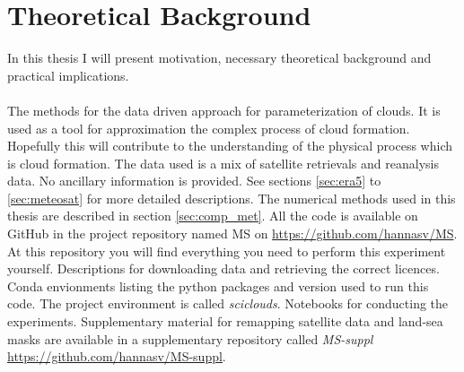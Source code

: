 \setcounter{chapter}{1} 
\chapter{Theoretical Background} \label{ch:theoretical_back}
In this thesis I will present motivation, necessary theoretical background and practical implications. 
\\ \\ 
The methods for the data driven approach for parameterization of clouds. It is used as a tool for approximation the complex process of cloud formation. Hopefully this will contribute to the understanding of the physical process which is cloud formation. The data used is a mix of satellite retrievals and reanalysis data. No ancillary information is provided. See sections \ref{sec:era5} to \ref{sec:meteosat} for more detailed descriptions. The numerical methods used in this thesis are described in section \ref{sec:comp_met}. All the code is available on GitHub in the project repository named MS on \href{https://github.com/hannasv/MS}{https://github.com/hannasv/MS}. At this repository you will find everything you need to perform this experiment yourself. Descriptions for downloading data and retrieving the correct licences. Conda envionments listing the python packages and version used to run this code. The project environment is called \textit{sciclouds}. Notebooks for conducting the experiments. Supplementary material for remapping satellite data and land-sea masks are available in a supplementary repository called \textit{MS-suppl}  \href{https://github.com/hannasv/MS-suppl}{https://github.com/hannasv/MS-suppl}.

